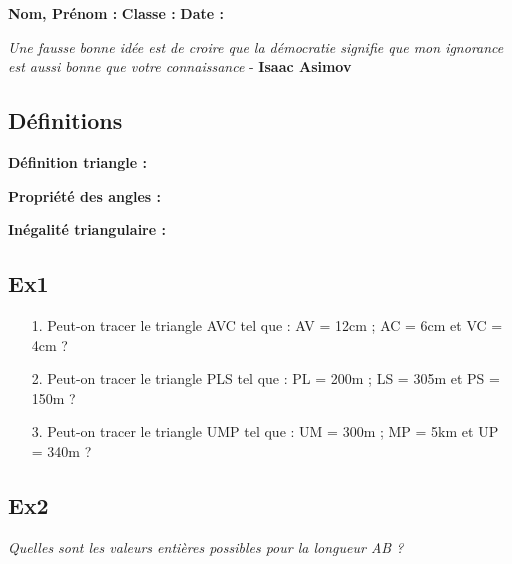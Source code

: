 



\textbf{Nom, Prénom :} \hspace{8cm} \textbf{Classe :} \hspace{3cm} \textbf{Date :}\\
\vspace{-0.8cm}
\begin{center}
  \textit{Une fausse bonne idée est de croire que la démocratie signifie que mon ignorance est aussi bonne que votre connaissance}  - \textbf{Isaac Asimov}
\end{center}
\vspace{-0.8cm}

\subsection*{Définitions}

\textbf{Définition triangle :} \dotfill \\
\Pointilles[1]

\textbf{Propriété des angles :} \dotfill \\
\Pointilles[2]

\textbf{Inégalité triangulaire :} \dotfill \\
\Pointilles[2]


\subsection*{Ex1}

\begin{enumerate}
  \item[1.] Peut-on tracer le triangle AVC tel que : AV = 12cm ; AC = 6cm et VC = 4cm ? \\ \Pointilles[2] 
  \item[2.] Peut-on tracer le triangle PLS tel que : PL = 200m ; LS = 305m et PS = 150m ? \\ \Pointilles[2] 
  \item[3.] Peut-on tracer le triangle UMP tel que : UM = 300m ; MP = 5km et UP = 340m ? \\ \Pointilles[2] 
\end{enumerate} 


\subsection*{Ex2}
\textit{Quelles sont les valeurs entières possibles pour la longueur AB ?}

